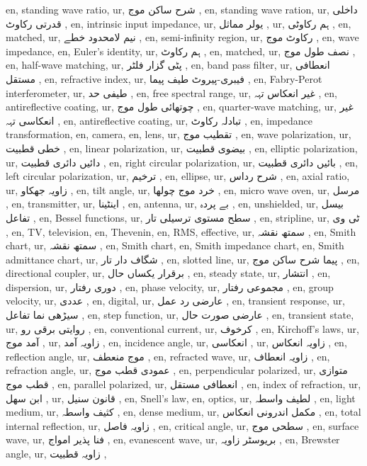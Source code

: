 en, standing wave ratio,
ur, شرح ساکن موج ,
en, standing wave ration,
ur, داخلی قدرتی رکاوٹ ,
en, intrinsic input impedance,
ur, یولر مماثل ,
ur, ہم رکاوٹی ,
en, matched,
ur, نیم لامحدود خطے ,
en, semi-infinity region,
ur, رکاوٹ موج ,
en, wave impedance,
en, Euler's identity,
ur, ہم رکاوٹ ,
en, matched,
ur, نصف طول موج ,
en, half-wave matching,
ur, پٹی گزار فلٹر ,
en, band pass filter,
ur, انعطافی مستقل ,
en, refractive index,
ur, فیبری-پیروٹ طیف پیما ,
en, Fabry-Perot interferometer,
ur, طیفی حد ,
en, free spectral range,
ur, غیر انعکاس تہہ ,
en, antireflective coating,
ur, چوتھائی طول موج ,
en, quarter-wave matching,
ur, غیر انعکاسی تہہ ,
en, antireflective coating,
ur, تبادلہ رکاوٹ ,
en, impedance transformation,
en, camera,
en, lens,
ur, تقطیب موج ,
en, wave polarization,
ur, خطی قطبیت ,
en, linear polarization,
ur, بیضوی قطبیت ,
en, elliptic polarization,
ur, دائیں دائری قطبیت ,
en, right circular polarization,
ur, بائیں دائری قطبیت ,
en, left circular polarization,
ur, ترخیم ,
en, ellipse,
ur, شرح رداس ,
en, axial ratio,
ur, زاویہ جھکاو ,
en, tilt angle,
ur, خرد موج چولھا ,
en, micro wave oven,
ur, مرسل ,
en, transmitter,
ur, اینٹینا ,
en, antenna,
ur, بے پردہ ,
en, unshielded,
ur, بیسل تفاعل ,
en, Bessel functions,
ur, سطح مستوی ترسیلی تار ,
en, stripline,
ur, ٹی وی ,
en, TV, television,
en, Thevenin,
en, RMS, effective,
ur, سمتھ نقشہ ,
en, Smith chart,
ur, سمتھ نقشہ ,
en, Smith chart,
en, Smith impedance chart,
en, Smith admittance chart,
ur, شگاف دار تار ,
en, slotted line,
ur, پیما شرح ساکن موج ,
en, directional coupler,
ur, برقرار یکساں حال ,
en, steady state,
ur, انتشار ,
en, dispersion,
ur, دوری رفتار ,
en, phase velocity,
ur, مجموعی رفتار ,
en, group velocity,
ur, عددی ,
en, digital,
ur, عارضی رد عمل ,
en, transient response,
ur, سیڑھی نما تفاعل ,
en, step function,
ur, عارضی صورت حال ,
en, transient state,
ur, روایتی برقی رو ,
en, conventional current,
ur, کرخوف ,
en, Kirchoff's laws,
ur, آمد موج ,
ur, زاویہ آمد ,
en, incidence angle,
ur, انعکاسی ,
ur, زاویہ انعکاس ,
en, reflection angle,
ur, موج منعطف ,
en, refracted wave,
ur, زاویہ انعطاف ,
en, refraction angle,
ur, عمودی قطب موج ,
en, perpendicular polarized,
ur, متوازی قطب موج ,
en, parallel polarized,
ur, انعطافی مستقل ,
en, index of refraction,
ur, ابن سھل ,
ur, قانون سنیل ,
en, Snell's law,
en, optics,
ur, لطیف واسطہ ,
en, light medium,
ur, کثیف واسطہ ,
en, dense medium,
ur, مکمل اندرونی انعکاس ,
en, total internal reflection,
ur, زاویہ فاصل ,
en, critical angle,
ur, سطحی موج ,
en, surface wave,
ur, فنا پذیر امواج ,
en, evanescent wave,
ur, بریوسٹر زاویہ ,
en, Brewster angle,
ur, زاویہ قطبیت ,
